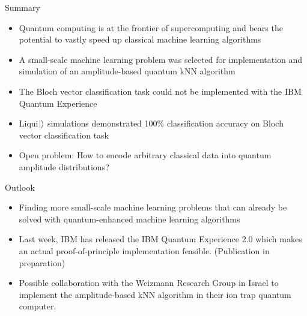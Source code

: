 \documentclass[10pt]{beamer}
\begin{document}
\begin{frame}{Summary}
\begin{itemize}
\item Quantum computing is at the frontier of supercomputing and bears the potential to vastly speed up classical machine learning algorithms
\item A small-scale machine learning problem was selected for implementation and simulation of an amplitude-based quantum kNN algorithm
\item The Bloch vector classification task could not be implemented with the IBM Quantum Experience
\item Liqui$\ket{}$ simulations demonstrated 100\% classification accuracy on Bloch vector classification task
\item Open problem: How to encode arbitrary classical data into quantum amplitude distributions?
\end{itemize}
\end{frame}

\begin{frame}{Outlook}

\begin{itemize}
\item Finding more small-scale machine learning problems that can already be solved with quantum-enhanced machine learning algorithms
\item Last week, IBM has released the IBM Quantum Experience 2.0 which makes an actual proof-of-principle implementation feasible. (Publication in preparation)
\item Possible collaboration with the Weizmann Research Group in Israel to implement the amplitude-based kNN algorithm in their ion trap quantum computer.
\end{itemize}
\end{frame}
\end{document}
